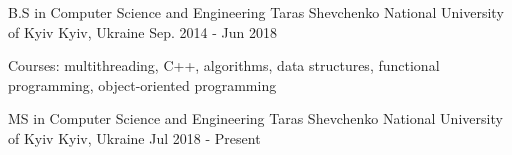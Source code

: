 \begin{cventries}
  \cventry
    {B.S in Computer Science and Engineering} %
    {Taras Shevchenko National University of Kyiv} %
    {Kyiv, Ukraine} %
    {Sep. 2014 - Jun 2018} %
    {
      \begin{cvitems} %
        \item { Courses: multithreading, C++, algorithms, data structures, functional programming, object-oriented programming}
      \end{cvitems}
    }
    
      \cventry
    {MS in Computer Science and Engineering} %
    {Taras Shevchenko National University of Kyiv} %
    {Kyiv, Ukraine} %
    {Jul 2018 - Present} %
    {    }
\end{cventries}
